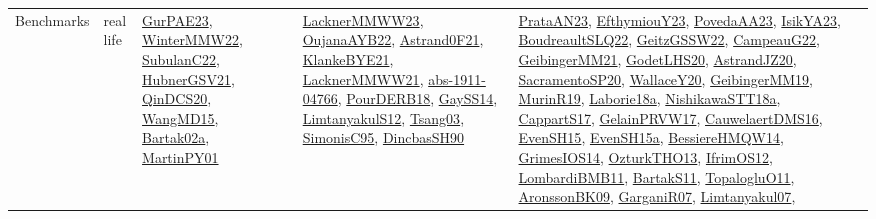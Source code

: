 {\begin{longtable}{lp{3cm}>{\raggedright}p{6cm}>{\raggedright}p{6cm}p{8cm}}
Benchmarks & real life & \href{articles/GurPAE23.pdf}{GurPAE23}\cite{GurPAE23}, \href{papers/WinterMMW22.pdf}{WinterMMW22}\cite{WinterMMW22}, \href{articles/SubulanC22.pdf}{SubulanC22}\cite{SubulanC22}, \href{articles/HubnerGSV21.pdf}{HubnerGSV21}\cite{HubnerGSV21}, \href{articles/QinDCS20.pdf}{QinDCS20}\cite{QinDCS20}, \href{articles/WangMD15.pdf}{WangMD15}\cite{WangMD15}, \href{papers/Bartak02a.pdf}{Bartak02a}\cite{Bartak02a}, \href{articles/MartinPY01.pdf}{MartinPY01}\cite{MartinPY01} & \href{articles/LacknerMMWW23.pdf}{LacknerMMWW23}\cite{LacknerMMWW23}, \href{papers/OujanaAYB22.pdf}{OujanaAYB22}\cite{OujanaAYB22}, \href{papers/Astrand0F21.pdf}{Astrand0F21}\cite{Astrand0F21}, \href{papers/KlankeBYE21.pdf}{KlankeBYE21}\cite{KlankeBYE21}, \href{papers/LacknerMMWW21.pdf}{LacknerMMWW21}\cite{LacknerMMWW21}, \href{articles/abs-1911-04766.pdf}{abs-1911-04766}\cite{abs-1911-04766}, \href{articles/PourDERB18.pdf}{PourDERB18}\cite{PourDERB18}, \href{papers/GaySS14.pdf}{GaySS14}\cite{GaySS14}, \href{articles/LimtanyakulS12.pdf}{LimtanyakulS12}\cite{LimtanyakulS12}, \href{articles/Tsang03.pdf}{Tsang03}\cite{Tsang03}, \href{papers/SimonisC95.pdf}{SimonisC95}\cite{SimonisC95}, \href{articles/DincbasSH90.pdf}{DincbasSH90}\cite{DincbasSH90} & \href{articles/PrataAN23.pdf}{PrataAN23}\cite{PrataAN23}, \href{papers/EfthymiouY23.pdf}{EfthymiouY23}\cite{EfthymiouY23}, \href{papers/PovedaAA23.pdf}{PovedaAA23}\cite{PovedaAA23}, \href{articles/IsikYA23.pdf}{IsikYA23}\cite{IsikYA23}, \href{papers/BoudreaultSLQ22.pdf}{BoudreaultSLQ22}\cite{BoudreaultSLQ22}, \href{papers/GeitzGSSW22.pdf}{GeitzGSSW22}\cite{GeitzGSSW22}, \href{articles/CampeauG22.pdf}{CampeauG22}\cite{CampeauG22}, \href{papers/GeibingerMM21.pdf}{GeibingerMM21}\cite{GeibingerMM21}, \href{papers/GodetLHS20.pdf}{GodetLHS20}\cite{GodetLHS20}, \href{articles/AstrandJZ20.pdf}{AstrandJZ20}\cite{AstrandJZ20}, \href{articles/SacramentoSP20.pdf}{SacramentoSP20}\cite{SacramentoSP20}, \href{articles/WallaceY20.pdf}{WallaceY20}\cite{WallaceY20}, \href{papers/GeibingerMM19.pdf}{GeibingerMM19}\cite{GeibingerMM19}, \href{papers/MurinR19.pdf}{MurinR19}\cite{MurinR19}, \href{papers/Laborie18a.pdf}{Laborie18a}\cite{Laborie18a}, \href{papers/NishikawaSTT18a.pdf}{NishikawaSTT18a}\cite{NishikawaSTT18a}, \href{papers/CappartS17.pdf}{CappartS17}\cite{CappartS17}, \href{papers/GelainPRVW17.pdf}{GelainPRVW17}\cite{GelainPRVW17}, \href{papers/CauwelaertDMS16.pdf}{CauwelaertDMS16}\cite{CauwelaertDMS16}, \href{papers/EvenSH15.pdf}{EvenSH15}\cite{EvenSH15}, \href{articles/EvenSH15a.pdf}{EvenSH15a}\cite{EvenSH15a}, \href{papers/BessiereHMQW14.pdf}{BessiereHMQW14}\cite{BessiereHMQW14}, \href{articles/GrimesIOS14.pdf}{GrimesIOS14}\cite{GrimesIOS14}, \href{articles/OzturkTHO13.pdf}{OzturkTHO13}\cite{OzturkTHO13}, \href{papers/IfrimOS12.pdf}{IfrimOS12}\cite{IfrimOS12}, \href{papers/LombardiBMB11.pdf}{LombardiBMB11}\cite{LombardiBMB11}, \href{articles/BartakS11.pdf}{BartakS11}\cite{BartakS11}, \href{articles/TopalogluO11.pdf}{TopalogluO11}\cite{TopalogluO11}, \href{papers/AronssonBK09.pdf}{AronssonBK09}\cite{AronssonBK09}, \href{papers/GarganiR07.pdf}{GarganiR07}\cite{GarganiR07}, \href{papers/Limtanyakul07.pdf}{Limtanyakul07}\cite{Limtanyakul07}, 
\end{longtable}}
